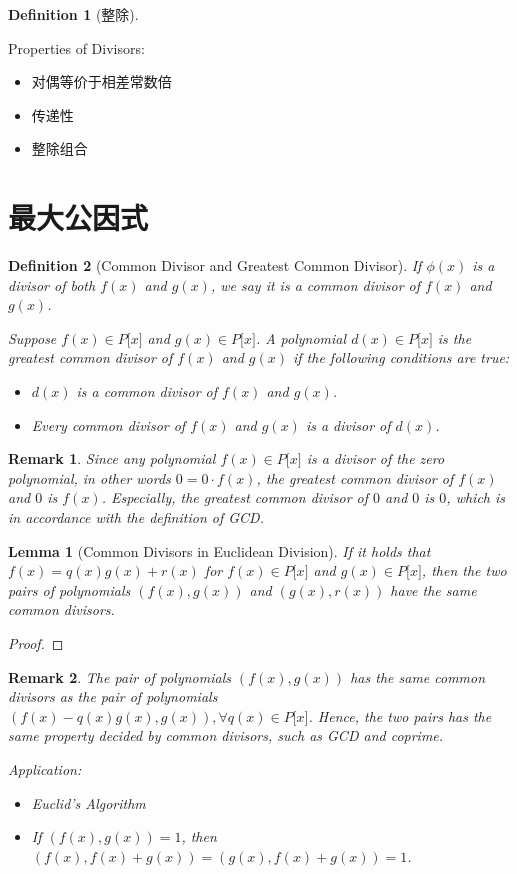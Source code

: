 \documentclass[onecolumn]{ctexart}
\newtheorem{definition}{Definition}
\newtheorem{lemma}{Lemma}
\newtheorem{remark}{Remark}
\begin{document}
\begin{definition}[整除]
  
\end{definition}

Properties of Divisors:
\begin{itemize}
  \item 对偶等价于相差常数倍
  \item 传递性
  \item 整除组合
\end{itemize}

\section{最大公因式}

\begin{definition}[Common Divisor and Greatest Common Divisor]
  If $\phi(x)$ is a divisor of both $f(x)$ and $g(x)$, we say it is a common 
  divisor of $f(x)$ and $g(x)$.

  Suppose $f(x) \in P\lbrack x \rbrack$ and $g(x) \in P\lbrack x \rbrack$. A 
  polynomial $d(x) \in P\lbrack x \rbrack$ is the greatest common divisor of 
  $f(x)$ and $g(x)$ if the following conditions are true:
  \begin{itemize}
    \item $d(x)$ is a common divisor of $f(x)$ and $g(x)$.
    \item Every common divisor of $f(x)$ and $g(x)$ is a divisor of $d(x)$.
  \end{itemize}
\end{definition}
\begin{remark}
  Since any polynomial $f(x) \in P\lbrack x \rbrack$ is a divisor of the zero 
  polynomial, in other words $0 = 0 \cdot f(x)$, the greatest common divisor of 
  $f(x)$ and $0$ is $f(x)$. Especially, the greatest common divisor of $0$ and $0$ 
  is $0$, which is in accordance with the definition of GCD.
\end{remark}

\begin{lemma}[Common Divisors in Euclidean Division]
  If it holds that $f(x) = q(x)g(x) + r(x)$ for $f(x) \in P\lbrack x \rbrack$ 
  and $g(x) \in P\lbrack x \rbrack$, then the two pairs of polynomials $(f(x), 
  g(x))$ and $(g(x), r(x))$ have the same common divisors.
\end{lemma}
\begin{proof}
  
\end{proof}
\begin{remark}
  The pair of polynomials $(f(x), g(x))$ has the same common divisors as the 
  pair of polynomials $(f(x) - q(x)g(x), g(x)), \forall q(x) \in P\lbrack x 
  \rbrack$. Hence, the two pairs has the same property decided by common 
  divisors, such as GCD and coprime.

  Application:
  \begin{itemize}
    \item Euclid's Algorithm
    \item If $(f(x), g(x)) = 1$, then $(f(x), f(x) + g(x)) = (g(x), f(x) + g(x)) 
    = 1$.
  \end{itemize}
\end{remark}
\end{document}
